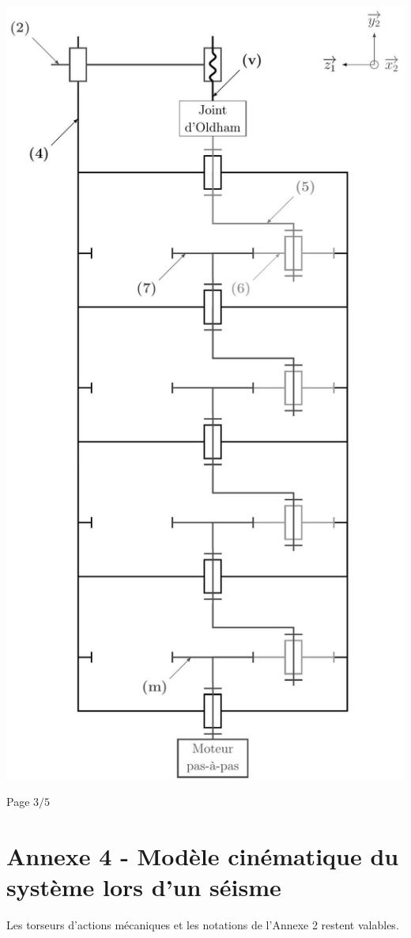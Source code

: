 \documentclass[10pt]{article}
\begin{document}
\begin{center}
\includegraphics[max width=\textwidth]{2024_04_26_3285cfc264024262add0g-17}
\end{center}

Page $3 / 5$

\section*{Annexe 4 - Modèle cinématique du système lors d'un séisme}
Les torseurs d'actions mécaniques et les notations de l'Annexe 2 restent valables.
\end{document}
